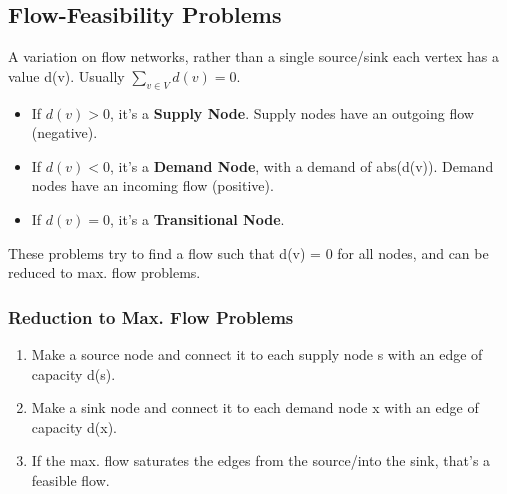 \subsection{Flow-Feasibility Problems}
A variation on flow networks, rather than a single source/sink each vertex has a value d(v). Usually \(\sum_{v \in V}d(v) = 0\).
\begin{itemize}
    \item If $d(v) > 0$, it's a \textbf{Supply Node}. Supply nodes have an outgoing flow (negative).
    \item If $d(v) < 0$, it's a \textbf{Demand Node}, with a demand of abs(d(v)). Demand nodes have an incoming flow (positive).
    \item If $d(v) = 0$, it's a \textbf{Transitional Node}.
\end{itemize}
These problems try to find a flow such that d(v) = 0 for all nodes, and can be reduced to max. flow problems.

\subsubsection{Reduction to Max. Flow Problems}
\begin{enumerate}
    \item Make a source node and connect it to each supply node s with an edge of capacity d(s).
    \item Make a sink node and connect it to each demand node x with an edge of capacity d(x).
    \item If the max. flow saturates the edges from the source/into the sink, that's a feasible flow.
\end{enumerate}
